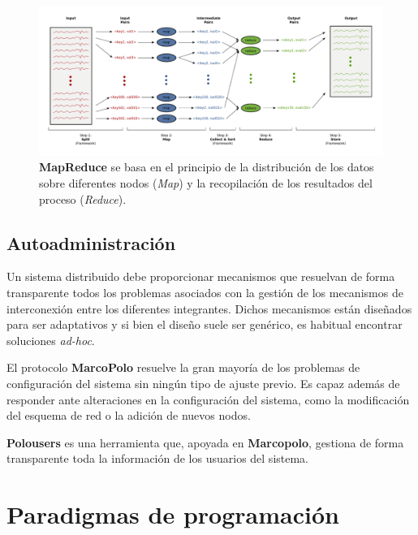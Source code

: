 \begin{figure}[H]
  \centering
  \includegraphics[width=\textwidth]{Chapter2/Figures/map-reduce}
  \caption[Ejemplo de MapReduce]{\textbf{MapReduce} se basa en el principio de la distribución de los datos sobre diferentes nodos (\textit{Map}) y la recopilación de los resultados del proceso (\textit{Reduce}).}
  \label{fig:mapreduce}
\end{figure}

\subsection{Autoadministración}
\label{teoria:autoadministracion}

Un sistema distribuido debe proporcionar mecanismos que resuelvan de forma transparente todos los problemas asociados con la gestión de los mecanismos de interconexión entre los diferentes integrantes. Dichos mecanismos están diseñados para ser adaptativos y si bien el diseño suele ser genérico, es habitual encontrar soluciones \textit{ad-hoc}.


El protocolo \textbf{MarcoPolo} resuelve la gran mayoría de los problemas de configuración del sistema sin ningún tipo de ajuste previo. Es capaz además de responder ante alteraciones en la configuración del sistema, como la modificación del esquema de red o la adición de nuevos nodos.

\textbf{Polousers} es una herramienta que, apoyada en \textbf{Marcopolo}, gestiona de forma transparente toda la información de los usuarios del sistema.

\section{Paradigmas de programación}

